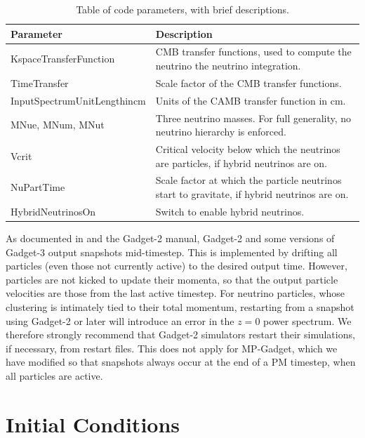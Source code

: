 \documentclass[useAMS, usenatbib]{mnras}
\begin{document}
\begin{table}
\begin{center}
\begin{tabular}{|l|l|}
\hline
    Parameter & Description \\
\hline
KspaceTransferFunction   & CMB transfer functions, used to compute the neutrino the neutrino integration. \\
TimeTransfer             & Scale factor of the CMB transfer functions. \\
InputSpectrumUnitLengthincm   & Units of the CAMB transfer function in cm. \\
MNue, MNum, MNut &  Three neutrino masses. For full generality, no neutrino  hierarchy is enforced. \\
Vcrit            & Critical velocity below which the neutrinos are particles, if hybrid neutrinos are on. \\
NuPartTime       & Scale factor at which the particle neutrinos start to gravitate, if hybrid neutrinos are on. \\
HybridNeutrinosOn       & Switch to enable hybrid neutrinos. \\
\hline
\end{tabular}
\end{center}
\caption{Table of code parameters, with brief descriptions.}
\label{tab:parameters}
\end{table}

As documented in \cite{Springel_2005} and the Gadget-2 manual, Gadget-2 and some versions of Gadget-3 output snapshots mid-timestep. This is implemented by drifting all particles (even those not currently active) to the desired output time. However, particles are not kicked to update their momenta, so that the output particle velocities are those from the last active timestep. For neutrino particles, whose clustering is intimately tied to their total momentum, restarting from a snapshot using Gadget-2 or later will introduce an error in the $z=0$ power spectrum. We therefore strongly recommend that Gadget-2 simulators restart their simulations, if necessary, from restart files. This does not apply for MP-Gadget, which we have modified so that snapshots always occur at the end of a PM timestep, when all particles are active.

\section{Initial Conditions}
\label{sec:initcond}
\end{document}
